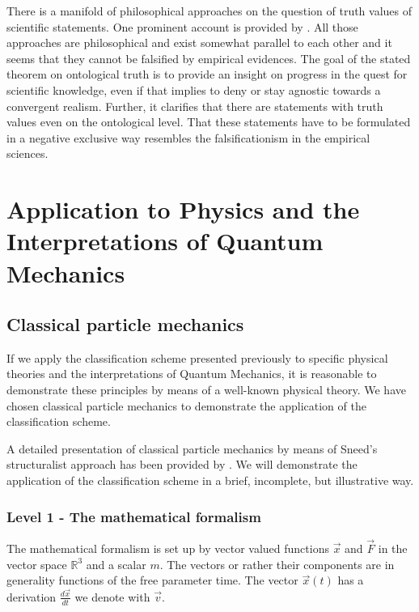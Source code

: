 \documentclass{article}
\begin{document}
There is a manifold of philosophical approaches on the question of truth values of scientific statements. One prominent account is provided by \cite{tarski1944semantic}. All those approaches are philosophical and exist somewhat parallel to each other and it seems that they cannot be falsified by empirical evidences. The goal of the stated theorem on ontological truth is to provide an insight on progress in the quest for scientific knowledge, even if that implies to deny or stay agnostic towards a convergent realism. Further, it clarifies that there are statements with truth values even on the ontological level. That these statements have to be formulated in a negative exclusive way resembles the falsificationism in the empirical sciences.

\newpage

\section{Application to Physics and the Interpretations of Quantum Mechanics}

\subsection{Classical particle mechanics}

If we apply the classification scheme presented previously to specific physical theories and the interpretations of Quantum Mechanics, it is reasonable to demonstrate these principles by means of a well-known physical theory. We have chosen classical particle mechanics to demonstrate the application of the classification scheme. \newline

A detailed presentation of classical particle mechanics by means of Sneed's structuralist approach has been provided by \cite[]{ishigaki1995formal}. We will demonstrate the application of the classification scheme in a brief, incomplete, but illustrative way.

\subsubsection*{Level 1 - The mathematical formalism}

The mathematical formalism is set up by vector valued functions $\vec  x$ and $\vec  F $ in the vector space $\mathbb{R}^3$ and a scalar $m$. The vectors or rather their components are in generality functions of the free parameter time. The vector $\vec  x(t)$ has a derivation $\frac{d\vec x}{dt}$ we denote with $\vec v$. \newline
\end{document}
